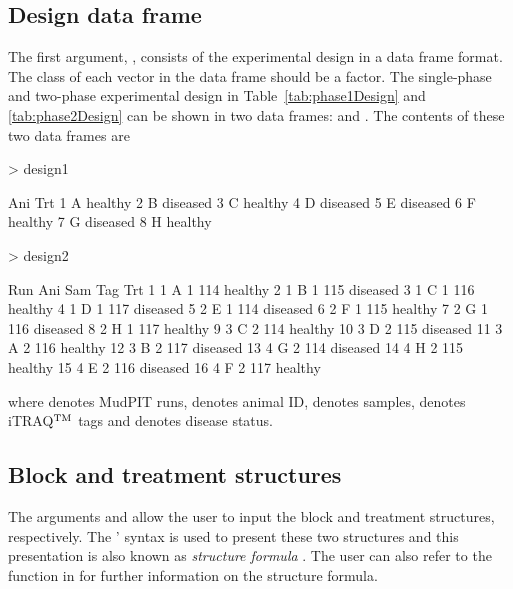 \documentclass[article]{jss}
\begin{document}
\subsection{Design data frame}
The first argument, , consists of the experimental design in a data frame format. The class of each vector in the data frame should be a factor. The single-phase and two-phase experimental design in Table~\ref{tab:phase1Design} and \ref{tab:phase2Design} can be shown in two data frames:  and . The contents of these two data frames are
\begin{CodeChunk}
\begin{CodeInput}
> design1
\end{CodeInput}
\begin{CodeOutput}
  Ani      Trt
1   A  healthy
2   B diseased
3   C  healthy
4   D diseased
5   E diseased
6   F  healthy
7   G diseased
8   H  healthy
\end{CodeOutput}

\begin{CodeInput}
> design2
\end{CodeInput}
\begin{CodeOutput}
   Run Ani Sam Tag      Trt
1    1   A   1 114  healthy
2    1   B   1 115 diseased
3    1   C   1 116  healthy
4    1   D   1 117 diseased
5    2   E   1 114 diseased
6    2   F   1 115  healthy
7    2   G   1 116 diseased
8    2   H   1 117  healthy
9    3   C   2 114  healthy
10   3   D   2 115 diseased
11   3   A   2 116  healthy
12   3   B   2 117 diseased
13   4   G   2 114 diseased
14   4   H   2 115  healthy
15   4   E   2 116 diseased
16   4   F   2 117  healthy
\end{CodeOutput}
\end{CodeChunk}
where  denotes MudPIT runs,  denotes animal ID,  denotes samples,  denotes iTRAQ$^{\rm TM}$ tags and  denotes disease status.

\subsection{Block and treatment structures}
The arguments  and  allow the user to input the block and treatment structures, respectively. The \citeauthor{Wilkinson1973}' syntax is used to present these two structures and this presentation is also known as \emph{structure formula} \citep{Wilkinson1973}. The user can also refer to the  function in  for further information on the structure formula. 
 
\end{document}
